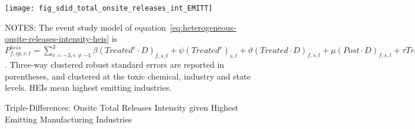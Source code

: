\begin{figure}[H]
    \centering
    \texttt{[image: fig\_sdid\_total\_onsite\_releases\_int\_EMITT]}
    \caption{Triple-Differences: Onsite Total Releases Intensity given Highest Emitting Manufacturing Industries}
    \label{fig:heterogeneous-onsite-releases-intensity-emitt}
    \begin{minipage}{14cm}
        \vspace{0.05in}
        \tiny NOTES: The event study model of equation~\ref{eq:heterogeneous-onsite-releases-intensity-heis} is $P_{f,cp,c,t}^{heis} = \sum_{{e = -3},{e \neq -1}}^{3} \beta (Treated^{e} \cdot D)_{f,s,t} + \psi (Treated^{e})_{s,t} + \vartheta (Treated \cdot D)_{f,s,t} + \mu (Post \cdot D)_{f,s,t} + \tau Treated_{s,t} + \rho D_{f,s,t} + \alpha Post_{t} + \delta X_{v,c,t-1} + \omega F_{f,t} + \lambda_{t} + \gamma_{f} + \phi_{cp} + \zeta_{c} + \eta_{c,t} + \varepsilon_{f,cp,c,t}$. Three-way clustered robust standard errors are reported in parentheses, and clustered at the toxic chemical, industry and state levels. HEIs mean highest emitting industries.
    \end{minipage}
\end{figure}